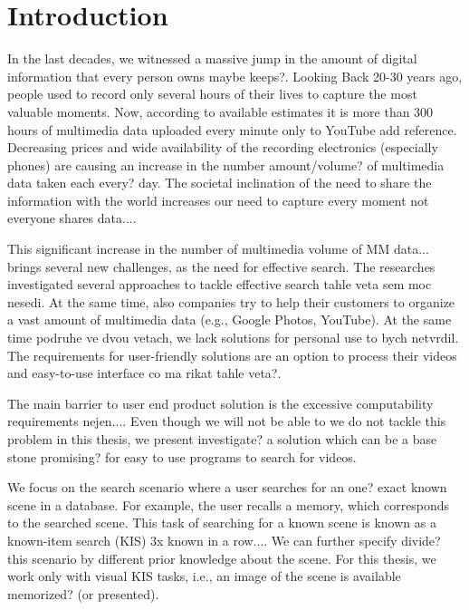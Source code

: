 \chapter*{Introduction}

In the last decades, we witnessed a massive jump in the amount of digital information that every person owns {\color{red} maybe keeps?}. {\color{red} Looking} Back 20-30 years ago, people used to record only several hours of their lives to capture the most valuable moments. Now, {\color{red} according to available estimates} it is more than 300 hours of multimedia {\color{red} data} uploaded every minute only to YouTube {\color{red} add reference}. Decreasing prices and wide availability of the recording electronics (especially phones) are causing an increase in the number {\color{red} amount/volume?} of multimedia {\color{red} data} taken each {\color{red} every?} day. The societal inclination of the need to share the information with the world increases our need to capture every moment {\color{red} not everyone shares data...}.

This significant increase in the number of multimedia {\color{red} volume of MM data...} brings several new challenges, as the need for effective search. The researches investigated several approaches to tackle effective search {\color{red} tahle veta sem moc nesedi}. At the same time, also companies try to help their customers to organize a vast amount of multimedia {\color{red} data} (e.g., Google Photos, YouTube). At the same time {\color{red} podruhe ve dvou vetach}, we lack solutions for personal use {\color{red} to bych netvrdil}. The requirements for user-friendly solutions are an option to process their videos and easy-to-use interface {\color{red} co ma rikat tahle veta?}.

The main barrier to user end product solution is the excessive computability requirements {\color{red} nejen...}. Even though we will not be able to {\color{red} we do not} tackle this problem in this thesis, we present {\color{red} investigate?} a solution which can be a base stone {\color{red} promising?} for easy to use programs to search for videos.

We focus on the {\color{red} search} scenario where a user searches for an {\color{red} one?} exact known scene in a database. For example, the user recalls a memory, which corresponds to the search{\color{red}ed} scene. This task of searching for a known scene is known as a known-item search (KIS) {\color{red} 3x known in a row...}. We can further specify {\color{red} divide?} this {\color{red} scenario} by different {\color{red} prior} knowledge about the scene. For this thesis, we work only with visual KIS tasks, i.e., an image of the scene is available {\color{red} memorized?} (or presented).

